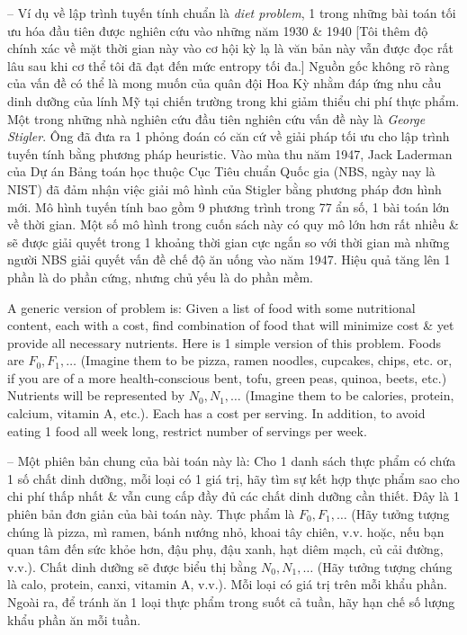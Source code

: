 \documentclass{article}
\begin{document}
\begin{itemize}
\begin{itemize}
        -- Ví dụ về lập trình tuyến tính chuẩn là {\it diet problem}, 1 trong những bài toán tối ưu hóa đầu tiên được nghiên cứu vào những năm 1930 \& 1940 [Tôi thêm độ chính xác về mặt thời gian này vào cơ hội kỳ lạ là văn bản này vẫn được đọc rất lâu sau khi cơ thể tôi đã đạt đến mức entropy tối đa.] Nguồn gốc không rõ ràng của vấn đề có thể là mong muốn của quân đội Hoa Kỳ nhằm đáp ứng nhu cầu dinh dưỡng của lính Mỹ tại chiến trường trong khi giảm thiểu chi phí thực phẩm. Một trong những nhà nghiên cứu đầu tiên nghiên cứu vấn đề này là {\it George Stigler}. Ông đã đưa ra 1 phỏng đoán có căn cứ về giải pháp tối ưu cho lập trình tuyến tính bằng phương pháp heuristic. Vào mùa thu năm 1947, {\sc Jack Laderman} của Dự án Bảng toán học thuộc Cục Tiêu chuẩn Quốc gia (NBS, ngày nay là NIST) đã đảm nhận việc giải mô hình của Stigler bằng phương pháp đơn hình mới. Mô hình tuyến tính bao gồm 9 phương trình trong 77 ẩn số, 1 bài toán lớn về thời gian. Một số mô hình trong cuốn sách này có quy mô lớn hơn rất nhiều \& sẽ được giải quyết trong 1 khoảng thời gian cực ngắn so với thời gian mà những người NBS giải quyết vấn đề chế độ ăn uống vào năm 1947. Hiệu quả tăng lên 1 phần là do phần cứng, nhưng chủ yếu là do phần mềm.

        A generic version of problem is: Given a list of food with some nutritional content, each with a cost, find combination of food that will minimize cost \& yet provide all necessary nutrients. Here is 1 simple version of this problem. Foods are $F_0,F_1,\ldots$ (Imagine them to be pizza, ramen noodles, cupcakes, chips, etc. or, if you are of a more health-conscious bent, tofu, green peas, quinoa, beets, etc.) Nutrients will be represented by $N_0,N_1,\ldots$ (Imagine them to be calories, protein, calcium, vitamin A, etc.). Each has a cost per serving. In addition, to avoid eating 1 food all week long, restrict number of servings per week.

        -- Một phiên bản chung của bài toán này là: Cho 1 danh sách thực phẩm có chứa 1 số chất dinh dưỡng, mỗi loại có 1 giá trị, hãy tìm sự kết hợp thực phẩm sao cho chi phí thấp nhất \& vẫn cung cấp đầy đủ các chất dinh dưỡng cần thiết. Đây là 1 phiên bản đơn giản của bài toán này. Thực phẩm là $F_0,F_1,\ldots$ (Hãy tưởng tượng chúng là pizza, mì ramen, bánh nướng nhỏ, khoai tây chiên, v.v. hoặc, nếu bạn quan tâm đến sức khỏe hơn, đậu phụ, đậu xanh, hạt diêm mạch, củ cải đường, v.v.). Chất dinh dưỡng sẽ được biểu thị bằng $N_0,N_1,\ldots$ (Hãy tưởng tượng chúng là calo, protein, canxi, vitamin A, v.v.). Mỗi loại có giá trị trên mỗi khẩu phần. Ngoài ra, để tránh ăn 1 loại thực phẩm trong suốt cả tuần, hãy hạn chế số lượng khẩu phần ăn mỗi tuần.


\end{itemize}
\end{itemize}
\end{document}

